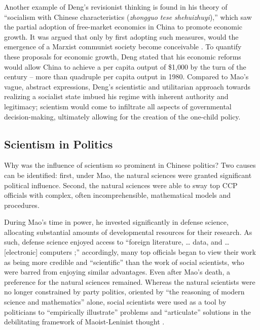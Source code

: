 Another example of Deng’s revisionist thinking is found in his theory of “socialism with Chinese characteristics (\emph{zhongguo tese shehuizhuyi}),” which saw the partial adoption of free-market economics in China to promote economic growth. It was argued that only by first adopting such measures, would the emergence of a Marxist communist society become conceivable \autocite{Fengqi2021DengRichFirst}. To quantify these proposals for economic growth, Deng stated that his economic reforms would allow China to achieve a per capita output of \$1,000 by the turn of the century – more than quadruple per capita output in 1980. Compared to Mao’s vague, abstract expressions, Deng’s scientistic and utilitarian approach towards realizing a socialist state imbued his regime with inherent authority and legitimacy; scientism would come to infiltrate all aspects of governmental decision-making, ultimately allowing for the creation of the one-child policy.

\subsection{Scientism in Politics}

Why was the influence of scientism so prominent in Chinese politics? Two causes can be identified: first, under Mao, the natural sciences were granted significant political influence. Second, the natural sciences were able to sway top CCP officials with complex, often incomprehensible, mathematical models and procedures.

During Mao’s time in power, he invested significantly in defense science, allocating substantial amounts of developmental resources for their research. As such, defense science enjoyed access to “foreign literature, … data, and … [electronic] computers \autocite[p.\ 139]{Greenhalgh2008JustOneChild};” accordingly, many top officials began to view their work as being more credible and “scientific” than the work of social scientists, who were barred from enjoying similar advantages. Even after Mao’s death, a preference for the natural sciences remained. Whereas the natural scientists were no longer constrained by party politics, oriented by “the reasoning of modern science and mathematics” alone, social scientists were used as a tool by politicians to “empirically illustrate” problems and “articulate” solutions in the debilitating framework of Maoist-Leninist thought \autocite[p.\ 84]{Greenhalgh2008JustOneChild}.

